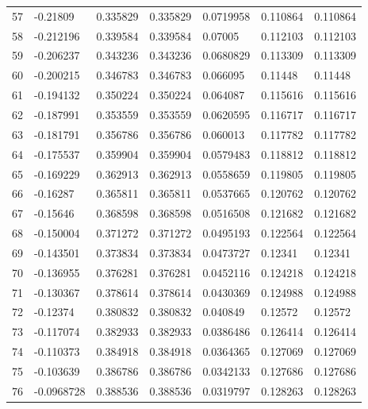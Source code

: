\begin{longtable}{l|lll|lll}
  57 & -0.21809     & 0.335829    & 0.335829    &  0.0719958   & 0.110864    & 0.110864    \\
  58 & -0.212196    & 0.339584    & 0.339584    &  0.07005     & 0.112103    & 0.112103    \\
  59 & -0.206237    & 0.343236    & 0.343236    &  0.0680829   & 0.113309    & 0.113309    \\
  60 & -0.200215    & 0.346783    & 0.346783    &  0.066095    & 0.11448     & 0.11448     \\
  61 & -0.194132    & 0.350224    & 0.350224    &  0.064087    & 0.115616    & 0.115616    \\
  62 & -0.187991    & 0.353559    & 0.353559    &  0.0620595   & 0.116717    & 0.116717    \\
  63 & -0.181791    & 0.356786    & 0.356786    &  0.060013    & 0.117782    & 0.117782    \\
  64 & -0.175537    & 0.359904    & 0.359904    &  0.0579483   & 0.118812    & 0.118812    \\
  65 & -0.169229    & 0.362913    & 0.362913    &  0.0558659   & 0.119805    & 0.119805    \\
  66 & -0.16287     & 0.365811    & 0.365811    &  0.0537665   & 0.120762    & 0.120762    \\
  67 & -0.15646     & 0.368598    & 0.368598    &  0.0516508   & 0.121682    & 0.121682    \\
  68 & -0.150004    & 0.371272    & 0.371272    &  0.0495193   & 0.122564    & 0.122564    \\
  69 & -0.143501    & 0.373834    & 0.373834    &  0.0473727   & 0.12341     & 0.12341     \\
  70 & -0.136955    & 0.376281    & 0.376281    &  0.0452116   & 0.124218    & 0.124218    \\
  71 & -0.130367    & 0.378614    & 0.378614    &  0.0430369   & 0.124988    & 0.124988    \\
  72 & -0.12374     & 0.380832    & 0.380832    &  0.040849    & 0.12572     & 0.12572     \\
  73 & -0.117074    & 0.382933    & 0.382933    &  0.0386486   & 0.126414    & 0.126414    \\
  74 & -0.110373    & 0.384918    & 0.384918    &  0.0364365   & 0.127069    & 0.127069    \\
  75 & -0.103639    & 0.386786    & 0.386786    &  0.0342133   & 0.127686    & 0.127686    \\
  76 & -0.0968728   & 0.388536    & 0.388536    &  0.0319797   & 0.128263    & 0.128263    \\

\end{longtable}
